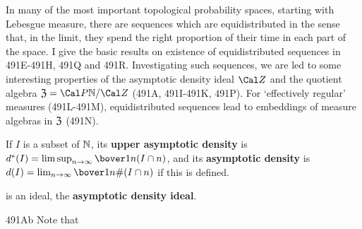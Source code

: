 
\def\chaptername{Further topics}
\def\sectionname{Equidistributed sequences}


In many of the most important topological probability spaces, starting
with Lebesgue measure, there are sequences which are
equidistributed in the sense that, in
the limit, they spend the right proportion of their time in each part
of the space.   I give the basic results on existence
of equidistributed sequences in
491E-491H,  %
491Q and 491R.   Investigating such sequences, we are led to some
interesting properties of the asymptotic
density ideal $\Cal Z$ and the quotient algebra
$\frak Z=\Cal P\Bbb N/\Cal Z$ (491A, 491I-491K,  %
491P).   For `effectively regular' measures (491L-491M), equidistributed
sequences lead to embeddings of measure algebras in $\frak Z$ (491N).

 If $I$ is a subset of
$\Bbb N$, its {\bf upper asymptotic density} is
$d^*(I)=\limsup_{n\to\infty}\bover1n(I\cap n)$, and its
{\bf asymptotic density} is
$d(I)=\lim_{n\to\infty}\bover1n\#(I\cap n)$ if this is defined.


\noindent is an ideal, the {\bf asymptotic density ideal}.

\spheader 491Ab Note that



